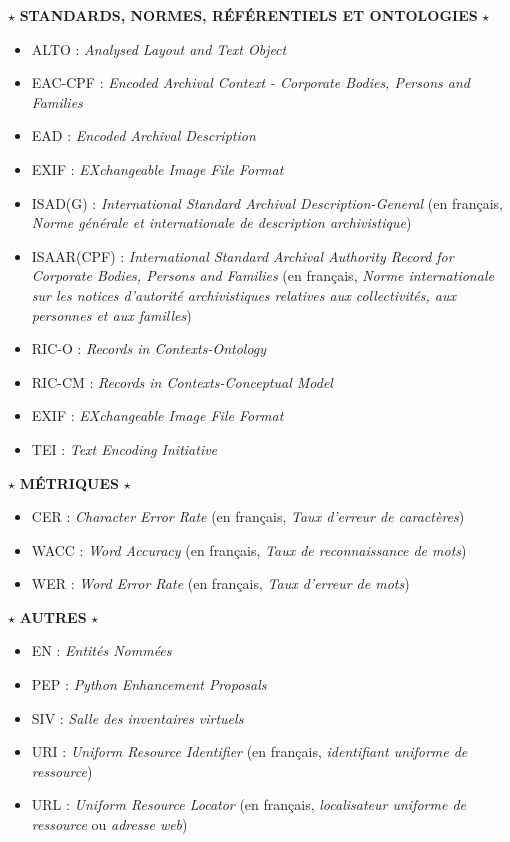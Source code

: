 \begin{center}
$\star$ \textbf{\textsc{STANDARDS, NORMES, RÉFÉRENTIELS ET ONTOLOGIES}} $\star$
\end{center} 
\begin{itemize}
    \item ALTO : \emph{Analysed Layout and Text Object}
    \item EAC-CPF : \emph{Encoded Archival Context - Corporate Bodies, Persons and Families} 
    \item EAD : \emph{Encoded Archival Description} 
    \item EXIF : \emph{EXchangeable Image File Format}
    \item ISAD(G) : \emph{International Standard Archival Description-General} (en français, \emph{Norme générale et internationale de description archivistique})
    \item ISAAR(CPF) : \emph{International Standard Archival Authority Record for Corporate Bodies, Persons and Families} (en français, \emph{Norme internationale sur les notices d'autorité archivistiques relatives aux collectivités, aux personnes et aux familles})
    \item RIC-O : \emph{Records in Contexts-Ontology}
    \item RIC-CM : \emph{Records in Contexts-Conceptual Model}
    \item EXIF : \emph{EXchangeable Image File Format}
    \item TEI : \emph{Text Encoding Initiative} 
\end{itemize}

\begin{center}
$\star$ \textbf{\textsc{MÉTRIQUES}} $\star$
\end{center} 
\begin{itemize}
    \item CER : \emph{Character Error Rate} (en français, \emph{Taux d'erreur de caractères})
    \item WACC : \emph{Word Accuracy} (en français, \emph{Taux de reconnaissance de mots})
    \item WER : \emph{Word Error Rate} (en français, \emph{Taux d'erreur de mots})
\end{itemize}

\begin{center}
$\star$ \textbf{\textsc{AUTRES}} $\star$
\end{center} 
\begin{itemize}
    \item EN : \emph{Entités Nommées}
    \item PEP : \emph{Python Enhancement Proposals}
    \item SIV : \emph{Salle des inventaires virtuels} 
    \item URI : \emph{Uniform Resource Identifier} (en français, \emph{identifiant uniforme de ressource})
    \item URL : \emph{Uniform Resource Locator} (en français, \emph{localisateur uniforme de ressource} ou \emph{adresse web})
\end{itemize}

\newpage
\thispagestyle{empty}